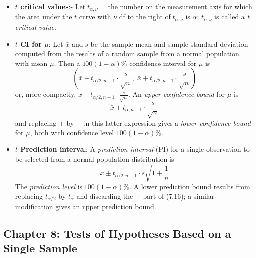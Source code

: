 \documentclass{report}
\begin{document}
\begin{itemize}
    \item \textbf{$t$ critical values}:-
        Let $t_{\alpha, \nu}$ = the number on the measurement axis for which the area under the $t$ curve with $\nu$ df to the right of $t_{\alpha, \nu}$ is $\alpha$; $t_{\alpha, \nu}$ is called a \textit{t critical value}.
    \item \textbf{$t$ CI for $\mu$}:
        Let $\bar{x}$ and $s$ be the sample mean and sample standard deviation computed from the results of a random sample from a normal population with mean $\mu$. Then a $100(1 - \alpha)\%$ confidence interval for $\mu$ is
        \[
            \left( \bar{x} - t_{\alpha/2, n-1} \cdot \frac{s}{\sqrt{n}}, \; \bar{x} + t_{\alpha/2, n-1} \cdot \frac{s}{\sqrt{n}} \right) \tag{7.15}
        \]
        or, more compactly, $\bar{x} \pm t_{\alpha/2, n-1} \cdot \frac{s}{\sqrt{n}}$.
        \bigbreak \noindent 
        An \textit{upper confidence bound} for $\mu$ is
        \[
            \bar{x} + t_{\alpha, n-1} \cdot \frac{s}{\sqrt{n}}
        \]
        and replacing $+$ by $-$ in this latter expression gives a \textit{lower confidence bound} for $\mu$, both with confidence level $100(1 - \alpha)\%$.
    \item \textbf{$t$ Prediction interval}:
        A \textit{prediction interval} (PI) for a single observation to be selected from a normal population distribution is
        \[
            \bar{x} \pm t_{\alpha/2, n-1} \cdot s \sqrt{1 + \frac{1}{n}} \tag{7.16}
        \]
        The \textit{prediction level} is $100(1 - \alpha)\%$. A lower prediction bound results from replacing $t_{\alpha/2}$ by $t_{\alpha}$ and discarding the $+$ part of (7.16); a similar modification gives an upper prediction bound.
    \end{itemize}


    \pagebreak 
    \subsection{Chapter 8: Tests of Hypotheses Based on a Single Sample}
    \bigbreak \noindent 
\end{document}
